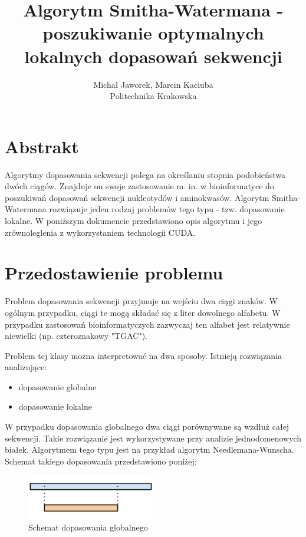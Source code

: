 \documentclass[a4paper,12pt]{article}
\newenvironment{lista}{
\begin{itemize}
  \setlength{\itemsep}{1pt}
  \setlength{\parskip}{0pt}
  \setlength{\parsep}{0pt}
}{\end{itemize}}
\begin{document}
\noindent



\title{Algorytm Smitha-Watermana - poszukiwanie optymalnych lokalnych dopasowań sekwencji }
\author{Michał Jaworek, Marcin Kaciuba\\ Politechnika Krakowska}
\maketitle



\section*{Abstrakt}
Algorytmy dopasowania sekwencji polega na określaniu stopnia podobieństwa dwóch ciągów. Znajduje on swoje zastosowanie m. in. w bioinformatyce do poszukiwań dopasowań sekwencji nukleotydów i aminokwasów. Algorytm Smitha-Watermana rozwiązuje jeden rodzaj problemów tego typu - tzw. dopasowanie lokalne. W poniższym dokumencie przedstawiono opis algorytmu i jego zrównoleglenia z wykorzystaniem technologii CUDA. 

\section*{Przedostawienie problemu}

Problem dopasowania sekwencji przyjmuje na wejściu dwa ciągi znaków. W ogólnym przypadku, ciągi te mogą składać się z liter dowolnego alfabetu. W przypadku zastosowań bioinformatyczych zazwyczaj ten alfabet jest relatywnie niewielki (np. czteroznakowy "TGAC"). 

Problem tej klasy można interpretować na dwa sposoby. Istnieją rozwiązania analizujące:
\begin{lista}
 \item dopasowanie globalne
\item dopasowanie lokalne
\end{lista}

W przypadku dopasowania globalnego dwa ciągi porównywane są wzdłuż całej sekwencji. Takie rozwiązanie jest wykorzystywane przy analizie jednodomenowych białek. Algorytmem tego typu jest na przykład algorytm Needlemana-Wunscha. Schemat takiego dopasowania przedstawiono poniżej: 

\begin{figure}[H]
  \vspace{5pt}
  \centering
  \begin{center}
  \includegraphics[width=0.5\textwidth]{images/Dopasowanie_globalne.png}
  \end{center}
  \caption{Schemat dopasowania globalnego}
 \end{figure}
  
\end{document}

